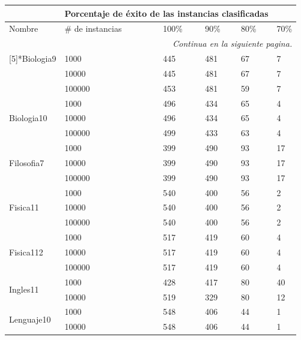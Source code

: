 \begin{longtable}{|p{3cm}|p{3cm}|p{2cm}|p{2cm}|p{2cm}|p{2cm}|}
\hline
	\rowcolor[gray]{0.5} 
	\multicolumn{2}{|c|}{Vista minable} &
	\multicolumn{4}{|c|}{Porcentaje de éxito de las instancias clasificadas}\\
	\hline
	\rowcolor[gray]{0.9} 
	Nombre & \# de instancias & 100\% & 90\% & 80\% & 70\%\\
	\hline
	\endhead
	\hline
	\multicolumn{6}{r}{\textit{Continua en la siguiente pagina.}} \\
	\endfoot
	\endlastfoot
	\multirow{3}[5]{*}{Biologia9} & 1000  & 445   & 481   & 67    & 7\\
\cline{2-6}      & 10000 & 445   & 481   & 67    & 7 \\
\cline{2-6}      & 100000 & 453   & 481   & 59    & 7 \\
\hline
\multirow{3}[6]{*}{Biologia10} & 1000  & 496   & 434   & 65    & 4 \\
\cline{2-6}      & 10000 & 496   & 434   & 65    & 4 \\
\cline{2-6}      & 100000 & 499   & 433   & 63    & 4 \\
\hline
\multirow{3}[6]{*}{Filosofia7} & 1000  & 399   & 490   & 93    & 17 \\
\cline{2-6}      & 10000 & 399   & 490   & 93    & 17 \\
\cline{2-6}      & 100000 & 399   & 490   & 93    & 17 \\
\hline
\multirow{3}[6]{*}{Fisica11} & 1000  & 540   & 400   & 56    & 2 \\
\cline{2-6}      & 10000 & 540   & 400   & 56    & 2 \\
\cline{2-6}      & 100000 & 540   & 400   & 56    & 2 \\
\hline
\multirow{3}[6]{*}{Fisica112} & 1000  & 517   & 419   & 60    & 4 \\
\cline{2-6}      & 10000 & 517   & 419   & 60    & 4 \\
\cline{2-6}      & 100000 & 517   & 419   & 60    & 4 \\
\hline
\multirow{2}[4]{*}{Ingles11} & 1000  & 428   & 417   & 80    & 40 \\
\cline{2-6}      & 10000 & 519   & 329   & 80    & 12 \\
\hline
\multirow{3}[6]{*}{Lenguaje10} & 1000  & 548   & 406   & 44    & 1 \\
\cline{2-6}      & 10000 & 548   & 406   & 44    & 1 \\

\end{longtable}
